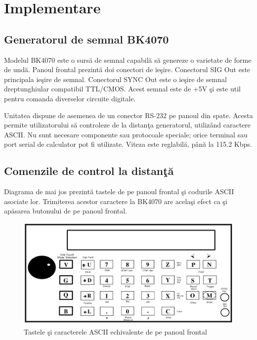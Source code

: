 
\chapter{Implementare} %
\label{Capitolul4}

\section{Generatorul de semnal BK4070}

Modelul BK4070 este o surs\u{a} de semnal capabil\u{a} s\u{a} genereze o varietate de forme de und\u{a}. Panoul frontal prezint\u{a} doi conectori de ie\c{s}ire. Conectorul SIG Out este principala ie\c{s}ire de semnal. Conectorul SYNC Out este o ie\c{s}ire de semnal dreptunghiular compatibil TTL/CMOS. Acest semnal este de +5V \c{s}i este util pentru comanda diverselor circuite digitale.

Unitatea dispune de asemenea de un conector RS-232 pe panoul din spate. Acesta permite utilizatorului s\u{a} controleze de la distan\c{t}a generatorul, utiliz\^{a}nd caractere ASCII. Nu sunt necesare componente sau protocoale speciale; orice terminal sau port serial de calculator pot fi utilizate. Viteza este reglabil\u{a}, p\^{a}n\u{a} la 115.2 Kbps. 

\section{Comenzile de control la distan\c{t}\u{a}}
Diagrama de mai jos prezint\u{a} tastele de pe panoul frontal \c{s}i codurile ASCII asociate lor. Trimiterea acestor caractere la BK4070 are acela\c{s}i efect ca \c{s}i ap\u{a}sarea butonului de pe panoul frontal.
\begin{figure}[!htb]
	\centering
	\includegraphics[scale=0.4]{panoufrontal.jpg}
	\caption{Tastele \c{s}i caracterele ASCII echivalente de pe panoul frontal}
	\label{panoufrontal}
\end{figure}

